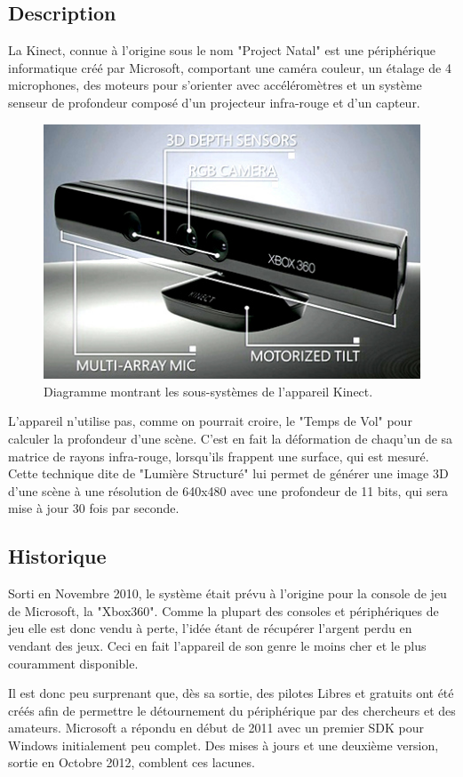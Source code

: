\documentclass[french,12pt]{report}
\begin{document}
			\subsection{Description}
La Kinect, connue à l'origine sous le nom "Project Natal" est une
périphérique informatique créé par Microsoft, comportant une caméra
couleur, un étalage de 4 microphones, des moteurs pour s'orienter avec 
accéléromètres 
et un système senseur de profondeur composé d'un 
projecteur infra-rouge et d'un capteur. 
  \begin{figure}[h!]
  \centering
  \includegraphics[width=0.8\linewidth]{images/kinect_diagram}
  \caption{Diagramme montrant les sous-systèmes de l'appareil Kinect.}
  \end{figure}
L'appareil n'utilise pas, comme on pourrait croire, le "Temps de Vol" pour
calculer la profondeur d'une scène. C'est en fait la déformation de chaqu'un de 
sa matrice de rayons infra-rouge,
lorsqu'ils frappent une surface, qui est mesuré. Cette technique dite de 
"Lumière Structuré"
lui permet de générer une image 3D d'une scène à une résolution de 640x480 avec 
une profondeur de 11 bits, qui sera mise à jour 30 fois par seconde.

			\subsection{Historique}
Sorti en Novembre 2010, le système était prévu à l'origine pour la console
de jeu de Microsoft, la "Xbox360". Comme la plupart des consoles et
périphériques de jeu elle
est donc vendu à perte, l'idée étant de récupérer l'argent perdu en vendant
des jeux. Ceci en fait l'appareil de son genre le moins cher et le plus couramment
disponible.

Il est donc peu surprenant que, dès sa sortie, des pilotes Libres et gratuits
ont été créés afin de permettre le détournement du périphérique par des
chercheurs et des amateurs. Microsoft a répondu en début de 2011 avec un
premier SDK pour Windows initialement peu complet. Des mises à jours et une
deuxième version, sortie en Octobre 2012, comblent ces lacunes.
\end{document}
